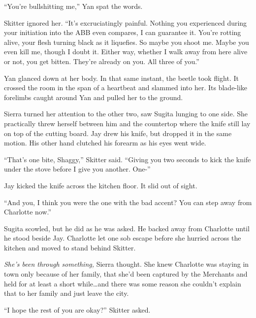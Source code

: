 ``You're bullshitting me,'' Yan spat the words.



Skitter ignored her.  ``It's excruciatingly painful.  Nothing you experienced during your initiation into the ABB even compares, I can guarantee it.  You're rotting alive, your flesh turning black as it liquefies.  So maybe you shoot me.  Maybe you even kill me, though I doubt it.  Either way, whether I walk away from here alive or not, you get bitten.  They're already on you.  All three of you.''



Yan glanced down at her body.  In that same instant, the beetle took flight.  It crossed the room in the span of a heartbeat and slammed into her.  Its blade-like forelimbs caught around Yan and pulled her to the ground.



Sierra turned her attention to the other two, saw Sugita lunging to one side.  She practically threw herself between him and the countertop where the knife still lay on top of the cutting board.  Jay drew his knife, but dropped it in the same motion.  His other hand clutched his forearm as his eyes went wide.



``That's one bite, Shaggy,'' Skitter said.  ``Giving you two seconds to kick the knife under the stove before I give you another.  One-''



Jay kicked the knife across the kitchen floor.  It slid out of sight.



``And you, I think you were the one with the bad accent?  You can step away from Charlotte now.''



Sugita scowled, but he did as he was asked.  He backed away from Charlotte until he stood beside Jay.  Charlotte let one sob escape before she hurried across the kitchen and moved to stand behind Skitter.



\emph{She's been through something, }Sierra thought.  She knew Charlotte was staying in town only because of her family, that she'd been captured by the Merchants and held for at least a short while\ldots and there was some reason she couldn't explain that to her family and just leave the city.



``I hope the rest of you are okay?''  Skitter asked.



